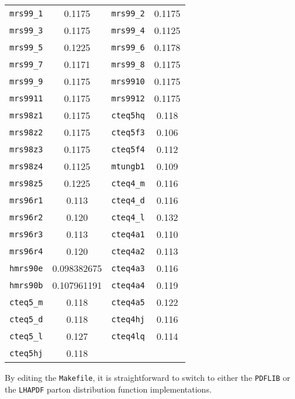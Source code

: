 \documentclass[12pt]{article}
\begin{document}
\begin{table}[h]
\begin{center}
\begin{tabular}{|c|c||c|c|}
\hline
{\tt mrs99\_1}  & 0.1175    & {\tt mrs99\_2}  & 0.1175      \\
{\tt mrs99\_3}  & 0.1175    & {\tt mrs99\_4}  & 0.1125      \\    
{\tt mrs99\_5}  & 0.1225    & {\tt mrs99\_6}  & 0.1178      \\    
{\tt mrs99\_7}  & 0.1171    & {\tt mrs99\_8}  & 0.1175      \\    
{\tt mrs99\_9}  & 0.1175    & {\tt mrs9910}  & 0.1175      \\    
{\tt mrs9911}  & 0.1175    & {\tt mrs9912}  & 0.1175      \\    
{\tt mrs98z1}  &  0.1175      & {\tt cteq5hq}  &  0.118  \\
{\tt mrs98z2}  &  0.1175      & {\tt cteq5f3}  &  0.106  \\
{\tt mrs98z3}  &  0.1175      & {\tt cteq5f4}  &  0.112  \\
{\tt mrs98z4}  &  0.1125      & {\tt mtungb1}  &  0.109  \\
{\tt mrs98z5}  &  0.1225      & {\tt cteq4\_m} &  0.116  \\
{\tt mrs96r1}  &  0.113       & {\tt cteq4\_d} &  0.116  \\
{\tt mrs96r2}  &  0.120       & {\tt cteq4\_l} &  0.132  \\
{\tt mrs96r3}  &  0.113       & {\tt cteq4a1}  &  0.110  \\
{\tt mrs96r4}  &  0.120       & {\tt cteq4a2}  &  0.113  \\
{\tt hmrs90e}  &  0.098382675 & {\tt cteq4a3}  &  0.116  \\
{\tt hmrs90b}  &  0.107961191 & {\tt cteq4a4}  &  0.119  \\
{\tt cteq5\_m} &  0.118       & {\tt cteq4a5}  &  0.122  \\
{\tt cteq5\_d} &  0.118       & {\tt cteq4hj}  &  0.116  \\
{\tt cteq5\_l} &  0.127       & {\tt cteq4lq}  &  0.114  \\
{\tt cteq5hj}  &  0.118       &   &    \\
\hline
\end{tabular}
\end{center}
\label{pdlabel}
\end{table}

By editing the {\tt Makefile}, it is straightforward to switch to
either the {\tt PDFLIB} or the {\tt LHAPDF} parton distribution
function implementations.
\end{document}
